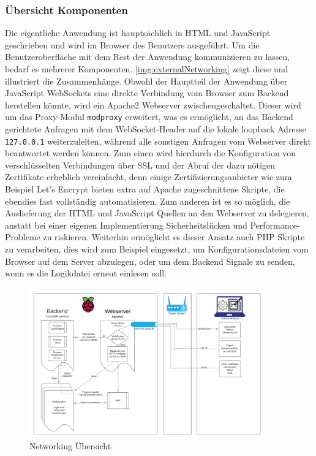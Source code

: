 \subsubsection{Übersicht Komponenten}
Die eigentliche Anwendung ist hauptsächlich in HTML und JavaScript geschrieben und wird im Browser des Benutzers ausgeführt. Um die Benutzeroberfläche mit dem Rest der Anwendung kommunizieren zu lassen, bedarf es mehrerer Komponenten. \autoref{img:externalNetworking} zeigt diese und illustriert die Zusammenhänge. Obwohl der Hauptteil der Anwendung über JavaScript WebSockets eine direkte Verbindung vom Browser zum Backend herstellen könnte, wird ein Apache2 Webserver zwischengeschaltet. Dieser wird um das Proxy-Modul \texttt{modproxy} erweitert, was es ermöglicht, an das Backend gerichtete Anfragen mit dem WebSocket-Header auf die lokale loopback Adresse \texttt{127.0.0.1} weiterzuleiten, während alle sonstigen Anfragen vom Webserver direkt beantwortet werden können. Zum einen wird hierdurch die Konfiguration von verschlüsselten Verbindungen über SSL und der Abruf der dazu nötigen Zertifikate erheblich vereinfacht, denn einige Zertifizierungsanbieter wie zum Beispiel Let's Encrypt\cite{URL:LetsEncrypt} bieten extra auf Apache zugeschnittene Skripte, die ebendies fast vollständig automatisieren. Zum anderen ist es so möglich, die Auslieferung der HTML und JavaScript Quellen an den Webserver zu delegieren, anstatt bei einer eigenen Implementierung Sicherheitslücken und Performance-Probleme zu riskieren. Weiterhin ermöglicht es dieser Ansatz auch PHP Skripte zu verarbeiten, dies wird zum Beispiel eingesetzt, um Konfigurationsdateien vom Browser auf dem Server abzulegen, oder um dem Backend Signale zu senden, wenn es die Logikdatei erneut einlesen soll.

\begin{figure}[H]
	\begin{center}
		\includegraphics[width=0.9\textwidth ,clip]{./images/BackendFrontend.pdf}
		\caption{Networking Übersicht}
		\label{img:externalNetworking}
	\end{center} 
\end{figure}

